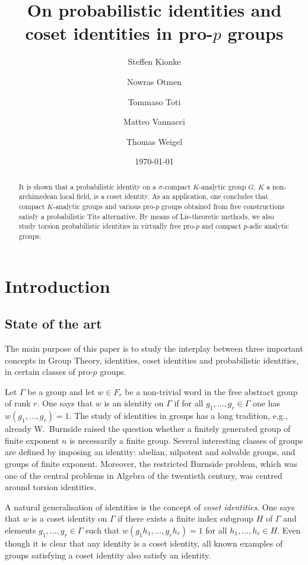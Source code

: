 \documentclass[a4paper,10pt]{amsart}
\title[On probabilistic identities and coset identities in pro-$p$ groups]{On probabilistic identities and \\ coset identities in pro-$p$ groups}
\author[Kionke]{Steffen Kionke}
\author[Otmen]{Nowras Otmen}
\author[Toti]{Tommaso Toti}
\author[Vannacci]{Matteo Vannacci}
\author[Weigel]{Thomas Weigel}
\date{\today}
\theoremstyle{plain}
\theoremstyle{definition}
\numberwithin{equation}{section}
\begin{document}
\begin{abstract}
It is shown that a probabilistic identity on a $\sigma$-compact $K$-analytic group $G$, $K$ a non-archimedean local field, is a coset identity. As an application, one concludes that compact $K$-analytic groups and various pro-$p$ groups obtained from free constructions satisfy a probabilistic Tits alternative. By means of Lie-theoretic methods, we also study torsion probabilistic identities in virtually free pro-$p$ and compact $p$-adic analytic groups.
\end{abstract}


\maketitle

\section{Introduction}

\subsection{State of the art}
The main purpose of this paper is to study the interplay between three important concepts in Group Theory, identities, coset identities and probabilistic identities, in certain classes of pro-$p$ groups.

Let $\Gamma$ be a group and let $w\in F_r$ be a non-trivial word in the free abstract group of rank $r$. One says that $w$ is an identity on $\Gamma$ if for all $g_1,\ldots,g_r \in \Gamma$ one has $w(g_1,\ldots,g_r)=1$.
The study of identities in groups has a long tradition, e.g., already W.~Burnside
raised the question whether a finitely generated group of finite exponent $n$ is necessarily a finite group. Several interesting classes of groups are defined by imposing an identity: abelian, nilpotent and solvable groups, and groups of finite exponent. Moreover, the restricted Burnside problem, which was one of the central problems in Algebra of the twentieth century, was centred around torsion identities.

A natural generalisation of identities is the concept of \emph{coset identities}. One says that $w$ is a coset identity on $\Gamma$  if there exists a finite index subgroup $H$ of $\Gamma$ and elements $g_1,\ldots,g_r \in \Gamma$ such that $w(g_1h_1,\ldots,g_rh_r)=1$ for all $h_1,\dots,h_r\in H$. Even though it is clear that any identity is a coset identity, all known examples of groups satisfying a coset identity also satisfy an identity.
\end{document}

